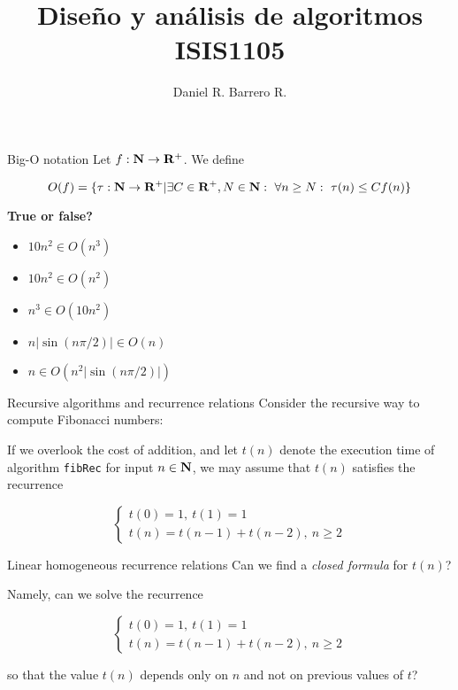 \documentclass{beamer}
\title{Diseño y análisis de algoritmos \\ ISIS1105}
\author{Daniel R. Barrero R.}
\institute{Universidad de los Andes}
\begin{document}
\frame{\titlepage}

%

\begin{frame}{Big-O notation}
	Let $f : \mathbf{N} \to \mathbf{R}^+$. We define

	\begin{equation*}
		O(f) = \{\tau : \mathbf{N} \to \mathbf{R}^+ | \exists C \in \mathbf{R}^+, N \in \mathbf{N}:
		\ \forall n \geq N:\ \tau(n) \leq Cf(n)\}
	\end{equation*}\pause

	\textbf{True or false?}
	\begin{itemize}
		\item $10n^2 \in O(n^3)$\pause
		\item $10n^2 \in O(n^2)$
		\item $n^3 \in O(10n^2)$\pause
		\item $n|\sin(n\pi/2)| \in O(n)$\pause
		\item $n \in O(n^2|\sin(n\pi/2)|)$
	\end{itemize}
\end{frame}

%

\begin{frame}{Recursive algorithms and recurrence relations}
	Consider the recursive way to compute Fibonacci numbers:

	
	\pause

	If we overlook the cost of addition, and let $t(n)$ denote the execution
	time of algorithm \texttt{fibRec} for input $n \in \mathbf{N}$, we may assume that
	$t(n)$ satisfies the recurrence

	\begin{displaymath}
		\begin{cases}
			t(0)= 1,\ t(1)= 1 \\
			t(n)= t(n-1) + t(n-2),\ n \geq 2
		\end{cases}
	\end{displaymath}
\end{frame}

%

\begin{frame}{Linear homogeneous recurrence relations}
	Can we find a \emph{closed formula} for $t(n)$?\pause

	\bigskip
	Namely, can we solve the recurrence

	\begin{displaymath}
		\begin{cases}
			t(0)= 1,\ t(1)= 1 \\
			t(n)= t(n-1) + t(n-2),\ n \geq 2
		\end{cases}
	\end{displaymath}

	so that the value $t(n)$ depends only on $n$ and not on previous values
	of $t$?
\end{frame}
\end{document}
